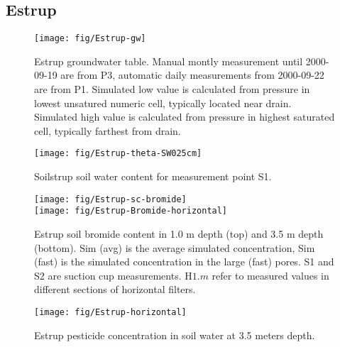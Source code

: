 \subsection*{Estrup}


\begin{figure}[htbp]
  \begin{center}
    \texttt{[image: fig/Estrup-gw]}
  \end{center}
  \caption{Estrup groundwater table.  Manual montly measurement until
    2000-09-19 are from P3, automatic daily measurements from
    2000-09-22 are from P1.  Simulated low value is calculated from
    pressure in lowest unsatured numeric cell, typically located near
    drain.  Simulated high value is calculated from pressure in
    highest saturated cell, typically farthest from drain.}
  \label{fig:Estrup-gw}
\end{figure}\FloatBarrier

\begin{figure}[htbp]
  \begin{center}
    \texttt{[image: fig/Estrup-theta-SW025cm]}
  \end{center}
  \caption{Soilstrup soil water content for measurement point S1.}
  \label{fig:Estrup-theta}
\end{figure}\FloatBarrier

\begin{figure}[htbp]
  \begin{center}
    \texttt{[image: fig/Estrup-sc-bromide]}\\
    \texttt{[image: fig/Estrup-Bromide-horizontal]}
  \end{center}
  \caption{Estrup soil bromide content in 1.0 m depth (top) and 3.5
    m depth (bottom).  Sim (avg) is the average simulated
    concentration, Sim (fast) is the simulated concentration in the
    large (fast) pores.  S1 and S2 are suction cup measurements.
    H$1$.$m$ refer to measured values in different sections of
    horizontal filters.}
  \label{fig:Estrup-bromide}
\end{figure}\FloatBarrier


\begin{figure}[htbp]
  \begin{center}
    \texttt{[image: fig/Estrup-horizontal]}
  \end{center}
  \caption{Estrup pesticide concentration in soil water at 3.5 meters
    depth.}
  \label{fig:Estrup-horizontal}
\end{figure}\FloatBarrier

